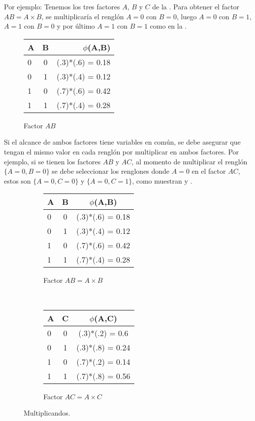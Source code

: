Por ejemplo: Tenemos los tres factores $A$, $B$ y $C$ de la . Para obtener el factor $AB = A \times B$, se multiplicaría el renglón $A=0$ con $B=0$, luego $A=0$ con $B=1$, $A=1$ con $B=0$ y por último $A=1$ con $B=1$ como en la .

\begin{figure}[H]
  \begin{center}
    \begin{tabular}{ l  c | r }
      A & B & $\phi$(A,B)\\ \hline
      0 & 0 & (.3)*(.6) = 0.18 \\ \hline
      0 & 1 & (.3)*(.4) = 0.12 \\ \hline
      1 & 0 & (.7)*(.6) = 0.42 \\ \hline
      1 & 1 & (.7)*(.4) = 0.28 \\
    \end{tabular}
  \end{center}
  \caption{Factor $AB$}
  \label{fig:FactorAB}
\end{figure}

\noindent Si el alcance de ambos factores tiene variables en común, se debe asegurar que tengan el mismo valor en cada renglón por multiplicar en ambos factores. Por ejemplo, si se tienen los factores $AB$ y $AC$, al momento de multiplicar el renglón $\{A=0,B=0\}$ se debe seleccionar los renglones donde $A=0$ en el factor $AC$, estos son $\{A=0,C=0\}$ y $\{A=0,C=1\}$, como muestran  y .

\begin{figure}[h!]
    \centering
    \begin{subfigure}[b]{0.4\textwidth}
        \centering
        \begin{tabular}{ l  c | c }
          A & B & $\phi$(A,B)\\ \hline
          0 & 0 & (.3)*(.6) = 0.18 \\ \hline
          0 & 1 & (.3)*(.4) = 0.12 \\ \hline
          1 & 0 & (.7)*(.6) = 0.42 \\ \hline
          1 & 1 & (.7)*(.4) = 0.28 \\
        \end{tabular}
        \caption{Factor $AB = A \times B$}
    \end{subfigure}
    ~ 
    \begin{subfigure}[b]{0.4\textwidth}
        \centering
        \begin{tabular}{ l  c | c }
          A & C & $\phi$(A,C)\\ \hline
          0 & 0 & (.3)*(.2) = 0.6 \\ \hline
          0 & 1 & (.3)*(.8) = 0.24 \\ \hline
          1 & 0 & (.7)*(.2) = 0.14 \\ \hline
          1 & 1 & (.7)*(.8) = 0.56 \\
        \end{tabular}
        \caption{Factor $AC = A \times C$}
    \end{subfigure}
    \caption{Multiplicandos.}
    \label{fig:FAFB}
\end{figure}


